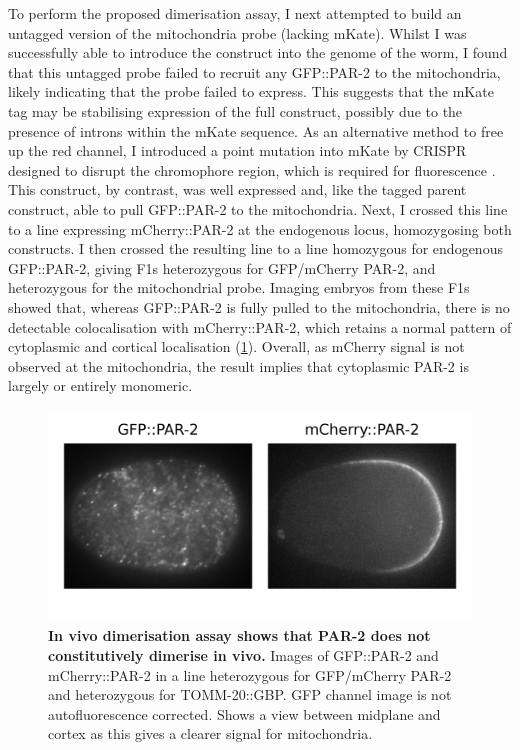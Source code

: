 \documentclass[12pt]{"report"}
\newcommand{\mycaption}[2]{\caption[#1]{\textbf{#1.} #2}}
\begin{document}
To perform the proposed dimerisation assay, I next attempted to build an untagged version of the mitochondria probe (lacking mKate). Whilst I was successfully able to  introduce the construct into the genome of the worm, I found that this untagged probe failed to recruit any GFP::PAR-2 to the mitochondria, likely indicating that the probe failed to express. This suggests that the mKate tag may be stabilising expression of the full construct, possibly due to the presence of introns within the mKate sequence. As an alternative method to free up the red channel, I introduced a point mutation into mKate by CRISPR designed to disrupt the chromophore region, which is required for fluorescence \citep{Pletnev2008}. This construct, by contrast, was well expressed and, like the tagged parent construct, able to pull GFP::PAR-2 to the mitochondria. Next, I crossed this line to a line expressing mCherry::PAR-2 at the endogenous locus, homozygosing both constructs. I then crossed the resulting line to a line homozygous for endogenous GFP::PAR-2, giving F1s heterozygous for GFP/mCherry PAR-2, and heterozygous for the mitochondrial probe.  Imaging embryos from these F1s showed that, whereas GFP::PAR-2 is fully pulled to the mitochondria, there is no detectable colocalisation with mCherry::PAR-2, which retains a normal pattern of cytoplasmic and cortical localisation (\cref{fig:tomm20_assay}). Overall, as mCherry signal is not observed at the mitochondria, the result implies that cytoplasmic PAR-2 is largely or entirely monomeric.\\

\begin{figure}
\includegraphics[scale=1]{tomm20_assay}
\centering
\mycaption{In vivo dimerisation assay shows that PAR-2 does not constitutively dimerise in vivo}{
Images of GFP::PAR-2 and mCherry::PAR-2 in a line heterozygous for GFP/mCherry PAR-2 and heterozygous for TOMM-20::GBP. GFP channel image is not autofluorescence corrected. Shows a view between midplane and cortex as this gives a clearer signal for mitochondria.
}
\label{fig:tomm20_assay}
\end{figure}
\end{document}

